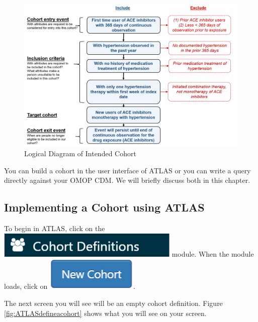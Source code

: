 \documentclass[11pt]{book}
\theoremstyle{definition}
\theoremstyle{definition}
\theoremstyle{definition}
\theoremstyle{remark}
\begin{document}
\begin{figure}

{\centering \includegraphics[width=0.9\linewidth]{images/Cohorts/CohortPractice} 

}

\caption{Logical Diagram of Intended Cohort}\label{fig:CohortPractice}
\end{figure}

You can build a cohort in the user interface of ATLAS or you can write a query directly against your OMOP CDM. We will briefly discuss both in this chapter.

\hypertarget{implementing-a-cohort-using-atlas}{%
\subsection{Implementing a Cohort using ATLAS}\label{implementing-a-cohort-using-atlas}}

To begin in ATLAS, click on the \includegraphics{images/Cohorts/cohortdefinition.png} module. When the module loads, click on \includegraphics{images/Cohorts/newcohort.png}.

The next screen you will see will be an empty cohort definition. Figure \ref{fig:ATLASdefineacohort} shows what you will see on your screen.
\end{document}
